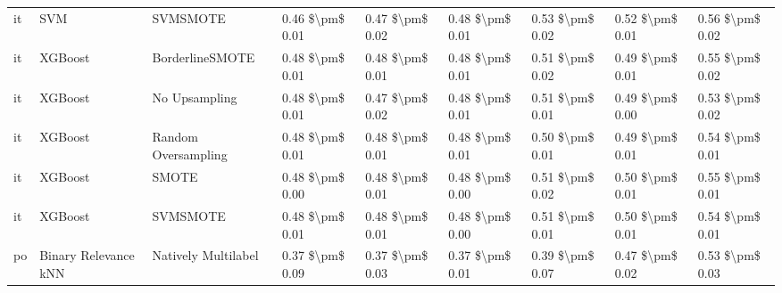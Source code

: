 \begin{tabular}{lllllllll}
      it &                             SVM &                      SVMSMOTE & 0.46 \$\textbackslash pm\$ 0.01 &           0.47 \$\textbackslash pm\$ 0.02 &       0.48 \$\textbackslash pm\$ 0.01 &        0.53 \$\textbackslash pm\$ 0.02 &                         0.52 \$\textbackslash pm\$ 0.01 &     0.56 \$\textbackslash pm\$ 0.02 \\
      it &                         XGBoost &               BorderlineSMOTE & 0.48 \$\textbackslash pm\$ 0.01 &           0.48 \$\textbackslash pm\$ 0.01 &       0.48 \$\textbackslash pm\$ 0.01 &        0.51 \$\textbackslash pm\$ 0.02 &                         0.49 \$\textbackslash pm\$ 0.01 &     0.55 \$\textbackslash pm\$ 0.02 \\
      it &                         XGBoost &                 No Upsampling & 0.48 \$\textbackslash pm\$ 0.01 &           0.47 \$\textbackslash pm\$ 0.02 &       0.48 \$\textbackslash pm\$ 0.01 &        0.51 \$\textbackslash pm\$ 0.01 &                         0.49 \$\textbackslash pm\$ 0.00 &     0.53 \$\textbackslash pm\$ 0.02 \\
      it &                         XGBoost &           Random Oversampling & 0.48 \$\textbackslash pm\$ 0.01 &           0.48 \$\textbackslash pm\$ 0.01 &       0.48 \$\textbackslash pm\$ 0.01 &        0.50 \$\textbackslash pm\$ 0.01 &                         0.49 \$\textbackslash pm\$ 0.01 &     0.54 \$\textbackslash pm\$ 0.01 \\
      it &                         XGBoost &                         SMOTE & 0.48 \$\textbackslash pm\$ 0.00 &           0.48 \$\textbackslash pm\$ 0.01 &       0.48 \$\textbackslash pm\$ 0.00 &        0.51 \$\textbackslash pm\$ 0.02 &                         0.50 \$\textbackslash pm\$ 0.01 &     0.55 \$\textbackslash pm\$ 0.01 \\
      it &                         XGBoost &                      SVMSMOTE & 0.48 \$\textbackslash pm\$ 0.01 &           0.48 \$\textbackslash pm\$ 0.01 &       0.48 \$\textbackslash pm\$ 0.00 &        0.51 \$\textbackslash pm\$ 0.01 &                         0.50 \$\textbackslash pm\$ 0.01 &     0.54 \$\textbackslash pm\$ 0.01 \\
      po &            Binary Relevance kNN &           Natively Multilabel & 0.37 \$\textbackslash pm\$ 0.09 &           0.37 \$\textbackslash pm\$ 0.03 &       0.37 \$\textbackslash pm\$ 0.01 &        0.39 \$\textbackslash pm\$ 0.07 &                         0.47 \$\textbackslash pm\$ 0.02 &     0.53 \$\textbackslash pm\$ 0.03 \\

\end{tabular}
